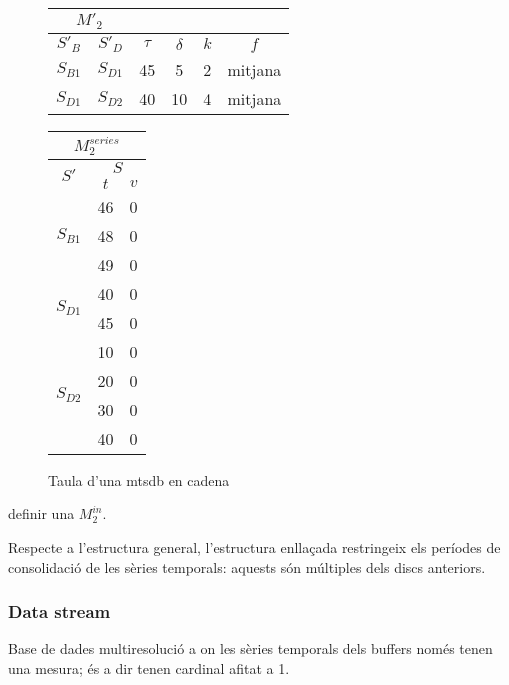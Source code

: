 \begin{figure}[tp]
  \centering
  \begin{tabular}{|c|c|c|c|c|c|}
    \multicolumn{2}{c}{$M'_2$} \\ \hline
    $S'_B$  & $S'_D$ & $\tau$ & $\delta$ & $k$ & $f$ \\ \hline
    $S_{B1}$ & $S_{D1}$ & 45 & 5  & 2 & mitjana  \\
    $S_{D1}$ & $S_{D2}$ & 40 & 10 & 4 & mitjana  \\ \hline
  \end{tabular}\qquad
  \begin{tabular}{|c|c|c|}
    \multicolumn{3}{c}{$M^{series}_{2}$} \\ \hline
    \multirow{2}{*}{$S'$}  &  \multicolumn{2}{c|}{$S$} \\ \cline{2-3}
    & $t$      & $v$  \\ \hline
    \multirow{3}{*}{$S_{B1}$} & 46 & 0 \\ 
    & 48 & 0 \\ 
    & 49 & 0 \\ \hline
    \multirow{2}{*}{$S_{D1}$} & 40 & 0 \\ 
    & 45 & 0 \\ \hline
    \multirow{4}{*}{$S_{D2}$} & 10 & 0 \\ 
    & 20 & 0 \\ 
    & 30 & 0 \\ 
    & 40 & 0 \\ \hline
  \end{tabular}
  \caption{Taula d'una mtsdb en cadena}
  \label{fig:model:mtsdb:cadena}
\end{figure}


definir una $M^{in}_2$.





Respecte a l'estructura general, l'estructura enllaçada restringeix
els períodes de consolidació de les sèries temporals: aquests són
múltiples dels discs anteriors.



\subsubsection{Data stream}



Base de dades multiresolució a on les sèries temporals dels buffers
només tenen una mesura; és a dir tenen cardinal afitat a 1.


